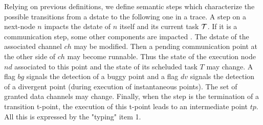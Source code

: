 \documentclass{article}
\begin{document}
Relying on previous definitions, we define semantic steps which characterize the possible transitions from a dstate to the following one in a trace. A step on a next-node $n$ impacts the dstate of $n$ itself and its current task ${\cal T}$. If it is a communication step, some other components are impacted . The dstate of the associated channel $ch$ may be modified. Then a pending communication point at the other side of $ch$ may become runnable. Thus the state of the execution node $nd$ associated to this point and the state of its scheluded task $T$ may change. A flag $bg$ signals the detection of a buggy point and a flag $dv$ signals the detection of a divergent point (during execution of instantaneous points). The set of granted data channels may change. Finally, when the step is the termination of a transition t-point, the execution of this t-point leads to an intermediate point $tp$. All this is expressed by the "typing" item 1.
\end{document}
